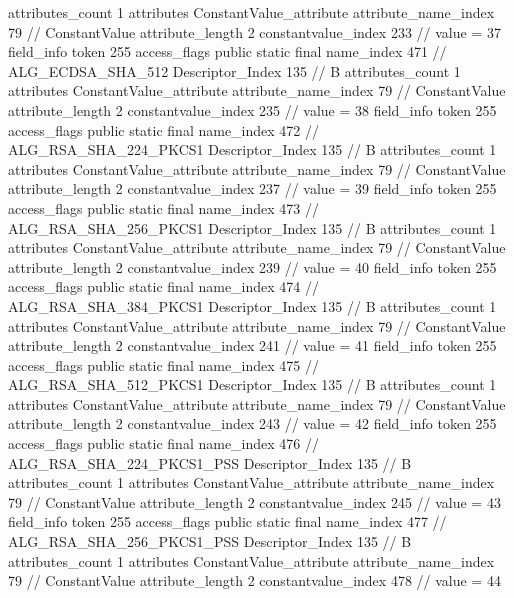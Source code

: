 {{{{{				attributes_count	1
				attributes {
				ConstantValue_attribute {
					attribute_name_index	79		// ConstantValue
					attribute_length	2
					constantvalue_index	233		// value = 37
				}
				}
			}
			field_info {
				token	255
				access_flags	public static final
				name_index	471		// ALG_ECDSA_SHA_512
				Descriptor_Index	135		// B
				attributes_count	1
				attributes {
				ConstantValue_attribute {
					attribute_name_index	79		// ConstantValue
					attribute_length	2
					constantvalue_index	235		// value = 38
				}
				}
			}
			field_info {
				token	255
				access_flags	public static final
				name_index	472		// ALG_RSA_SHA_224_PKCS1
				Descriptor_Index	135		// B
				attributes_count	1
				attributes {
				ConstantValue_attribute {
					attribute_name_index	79		// ConstantValue
					attribute_length	2
					constantvalue_index	237		// value = 39
				}
				}
			}
			field_info {
				token	255
				access_flags	public static final
				name_index	473		// ALG_RSA_SHA_256_PKCS1
				Descriptor_Index	135		// B
				attributes_count	1
				attributes {
				ConstantValue_attribute {
					attribute_name_index	79		// ConstantValue
					attribute_length	2
					constantvalue_index	239		// value = 40
				}
				}
			}
			field_info {
				token	255
				access_flags	public static final
				name_index	474		// ALG_RSA_SHA_384_PKCS1
				Descriptor_Index	135		// B
				attributes_count	1
				attributes {
				ConstantValue_attribute {
					attribute_name_index	79		// ConstantValue
					attribute_length	2
					constantvalue_index	241		// value = 41
				}
				}
			}
			field_info {
				token	255
				access_flags	public static final
				name_index	475		// ALG_RSA_SHA_512_PKCS1
				Descriptor_Index	135		// B
				attributes_count	1
				attributes {
				ConstantValue_attribute {
					attribute_name_index	79		// ConstantValue
					attribute_length	2
					constantvalue_index	243		// value = 42
				}
				}
			}
			field_info {
				token	255
				access_flags	public static final
				name_index	476		// ALG_RSA_SHA_224_PKCS1_PSS
				Descriptor_Index	135		// B
				attributes_count	1
				attributes {
				ConstantValue_attribute {
					attribute_name_index	79		// ConstantValue
					attribute_length	2
					constantvalue_index	245		// value = 43
				}
				}
			}
			field_info {
				token	255
				access_flags	public static final
				name_index	477		// ALG_RSA_SHA_256_PKCS1_PSS
				Descriptor_Index	135		// B
				attributes_count	1
				attributes {
				ConstantValue_attribute {
					attribute_name_index	79		// ConstantValue
					attribute_length	2
					constantvalue_index	478		// value = 44
}}}}}}}
